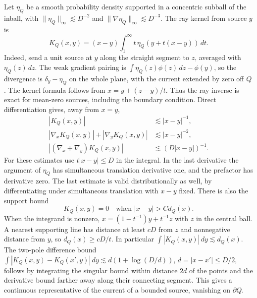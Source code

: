 \documentclass[11pt]{article}
\newcommand{\1}{\mathbf{1}}
\numberwithin{equation}{section}
\begin{document}
Let \(\eta_Q\) be a smooth probability density supported in a
concentric subball of the inball, with
\(\|\eta_Q\|_\infty\lesssim D^{-2}\) and
\(\|\nabla\eta_Q\|_\infty\lesssim D^{-3}\).
The ray kernel from source \(y\) is
\[
 K_Q(x,y)=(x-y)\int_1^\infty t\,\eta_Q(y+t(x-y))\,dt .
\]
Indeed, send a unit source at \(y\) along the straight segment
to \(z\), averaged with \(\eta_Q(z)\,dz\). The weak gradient
pairing is \(\int\eta_Q(z)\phi(z)\,dz-\phi(y)\), so the
divergence is \(\delta_y-\eta_Q\) on the whole plane, with the
current extended by zero off \(Q\). The kernel formula follows
from \(x=y+(z-y)/t\). Thus the ray inverse is exact for
mean-zero sources, including the boundary condition. Direct
differentiation gives, away from \(x=y\),
\[
\begin{aligned}
 |K_Q(x,y)|&\lesssim |x-y|^{-1},\\
 |\nabla_x K_Q(x,y)|+|\nabla_y K_Q(x,y)|&\lesssim |x-y|^{-2},\\
 |(\nabla_x+\nabla_y)K_Q(x,y)|&\lesssim (D|x-y|)^{-1}.
\end{aligned}
\]
For these estimates use \(t|x-y|\le D\) in the integral.
In the last derivative the argument of \(\eta_Q\) has
simultaneous translation derivative one, and the prefactor has
derivative zero. The last estimate is valid distributionally
as well, by differentiating under simultaneous translation
with \(x-y\) fixed. There is also the support bound
\begin{equation}\label{eq:ray-support-self-contained}
 K_Q(x,y)=0\quad\text{when }|x-y|> C d_Q(x).
\end{equation}
When the integrand is nonzero, \(x=(1-t^{-1})y+t^{-1}z\)
with \(z\) in the central ball. A nearest supporting line
has distance at least \(cD\) from \(z\) and nonnegative
distance from \(y\), so \(d_Q(x)\ge cD/t\).
In particular \(\int |K_Q(x,y)|\,dy\lesssim d_Q(x)\).
The two-pole difference bound
\(\int |K_Q(x,y)-K_Q(x',y)|\,dy
 \lesssim d(1+\log(D/d))\), \(d=|x-x'|\le D/2\),
follows by integrating the singular bound within distance
\(2d\) of the points and the derivative bound farther away
along their connecting segment. This gives a continuous
representative of the current of a bounded source, vanishing
on \(\partial Q\).
\end{document}
